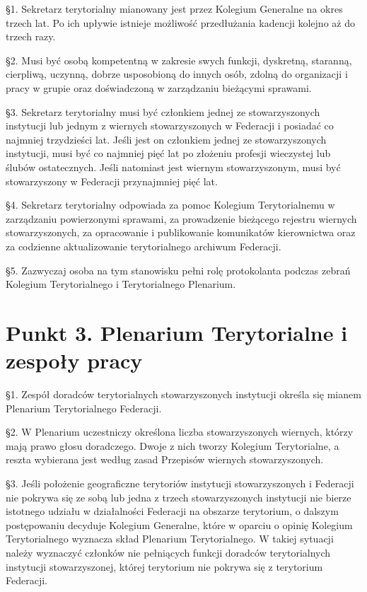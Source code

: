 
 \S{}1. Sekretarz terytorialny mianowany jest przez Kolegium Generalne na okres trzech lat. Po ich upływie istnieje możliwość przedłużania kadencji kolejno aż do trzech razy.

\S{}2. Musi być osobą kompetentną w zakresie swych funkcji, dyskretną, staranną, cierpliwą, uczynną, dobrze usposobioną do innych osób, zdolną do organizacji i pracy w grupie oraz doświadczoną w zarządzaniu bieżącymi sprawami.

\S{}3. Sekretarz terytorialny musi być członkiem jednej ze stowarzyszonych instytucji lub jednym z wiernych stowarzyszonych w Federacji i posiadać co najmniej trzydzieści lat. Jeśli jest on członkiem jednej ze stowarzyszonych instytucji, musi być co najmniej pięć lat po złożeniu profesji wieczystej lub ślubów ostatecznych. Jeśli natomiast jest wiernym stowarzyszonym, musi być stowarzyszony w Federacji przynajmniej pięć lat.

\S{}4. Sekretarz terytorialny odpowiada za pomoc Kolegium Terytorialnemu w zarządzaniu powierzonymi sprawami, za prowadzenie bieżącego rejestru wiernych stowarzyszonych, za opracowanie i publikowanie komunikatów kierownictwa oraz za codzienne aktualizowanie terytorialnego archiwum Federacji.

\S{}5. Zazwyczaj osoba na tym stanowisku pełni rolę protokolanta podczas zebrań Kolegium Terytorialnego i Terytorialnego Plenarium.


\section{Punkt 3. Plenarium Terytorialne i zespoły pracy}


 \S{}1. Zespół doradców terytorialnych stowarzyszonych instytucji określa się mianem Plenarium Terytorialnego Federacji.

\S{}2. W Plenarium uczestniczy określona liczba stowarzyszonych wiernych, którzy mają prawo głosu doradczego. Dwoje z nich tworzy Kolegium Terytorialne, a reszta wybierana jest według zasad Przepisów wiernych stowarzyszonych.

\S{}3. Jeśli położenie geograficzne terytoriów instytucji stowarzyszonych i Federacji nie pokrywa się ze sobą lub jedna z trzech stowarzyszonych instytucji nie bierze istotnego udziału w działalności Federacji na obszarze terytorium, o dalszym postępowaniu decyduje Kolegium Generalne, które w oparciu o opinię Kolegium Terytorialnego wyznacza skład Plenarium Terytorialnego. W takiej sytuacji należy wyznaczyć członków nie pełniących funkcji doradców terytorialnych instytucji stowarzyszonej, której terytorium nie pokrywa się z terytorium Federacji.

